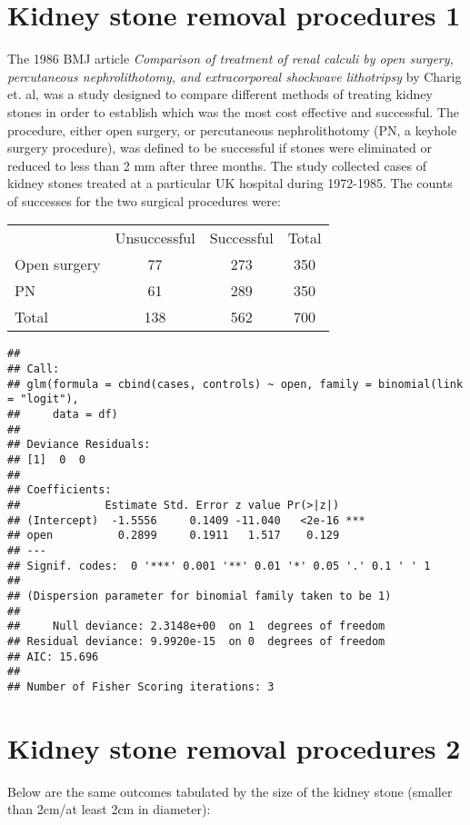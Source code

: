 \documentclass[landscape,twocolumn,letterpaper,9pt,reqno]{article}\usepackage[]{graphicx}\usepackage[]{color}
\newenvironment{knitrout}{}{} %
\begin{document}
	


\section{Kidney stone removal procedures 1}
The 1986 BMJ article \textit{Comparison of treatment of renal calculi by open surgery, percutaneous nephrolithotomy, and extracorporeal shockwave lithotripsy} by Charig et. al, was a study designed to compare different methods of treating kidney stones in order to establish which was the most cost effective and successful. The procedure, either open surgery, or percutaneous nephrolithotomy (PN, a keyhole surgery procedure), was defined to be successful if stones were eliminated or reduced to less than 2 mm after three months. The study collected cases of kidney stones treated at a particular UK hospital during 1972-1985. The counts of successes for the two surgical procedures were:

\begin{table}[h]
\centering
\begin{tabular}{lcc|c}
	& Unsuccessful &  Successful & Total\\
Open surgery & 77 & 273 & 350 \\
PN & 61 & 289 & 350 \\
\hline
Total & 138 & 562 & 700
\end{tabular}
\end{table}


\begin{knitrout}
\color{fgcolor}
\begin{verbatim}
## 
## Call:
## glm(formula = cbind(cases, controls) ~ open, family = binomial(link = "logit"), 
##     data = df)
## 
## Deviance Residuals: 
## [1]  0  0
## 
## Coefficients:
##             Estimate Std. Error z value Pr(>|z|)    
## (Intercept)  -1.5556     0.1409 -11.040   <2e-16 ***
## open          0.2899     0.1911   1.517    0.129    
## ---
## Signif. codes:  0 '***' 0.001 '**' 0.01 '*' 0.05 '.' 0.1 ' ' 1
## 
## (Dispersion parameter for binomial family taken to be 1)
## 
##     Null deviance: 2.3148e+00  on 1  degrees of freedom
## Residual deviance: 9.9920e-15  on 0  degrees of freedom
## AIC: 15.696
## 
## Number of Fisher Scoring iterations: 3
\end{verbatim}

\end{knitrout}

\clearpage

\section{Kidney stone removal procedures 2}
Below are the same outcomes tabulated by the size of the kidney stone (smaller than 2cm/at least 2cm in diameter):
\end{document}
